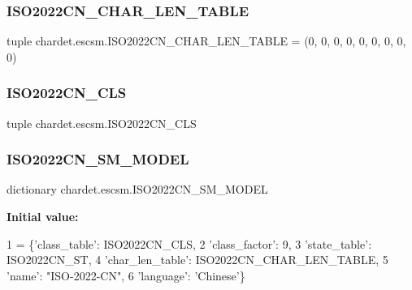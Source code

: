 \subsubsection{\texorpdfstring{I\+S\+O2022\+C\+N\+\_\+\+C\+H\+A\+R\+\_\+\+L\+E\+N\+\_\+\+T\+A\+B\+LE}{ISO2022CN\_CHAR\_LEN\_TABLE}}
{\footnotesize\ttfamily tuple chardet.\+escsm.\+I\+S\+O2022\+C\+N\+\_\+\+C\+H\+A\+R\+\_\+\+L\+E\+N\+\_\+\+T\+A\+B\+LE = (0, 0, 0, 0, 0, 0, 0, 0, 0)}

\mbox{\label{namespacechardet_1_1escsm_a5c5e3dadf36c1a89eb2a970acc25160c}} 
\subsubsection{\texorpdfstring{I\+S\+O2022\+C\+N\+\_\+\+C\+LS}{ISO2022CN\_CLS}}
{\footnotesize\ttfamily tuple chardet.\+escsm.\+I\+S\+O2022\+C\+N\+\_\+\+C\+LS}

\mbox{\label{namespacechardet_1_1escsm_a98919247b6ea84f408a1659b3e2fbdd3}} 
\subsubsection{\texorpdfstring{I\+S\+O2022\+C\+N\+\_\+\+S\+M\+\_\+\+M\+O\+D\+EL}{ISO2022CN\_SM\_MODEL}}
{\footnotesize\ttfamily dictionary chardet.\+escsm.\+I\+S\+O2022\+C\+N\+\_\+\+S\+M\+\_\+\+M\+O\+D\+EL}

{\bfseries Initial value\+:}
\begin{DoxyCode}
1 =  \{\textcolor{stringliteral}{'class\_table'}: ISO2022CN\_CLS,
2                       \textcolor{stringliteral}{'class\_factor'}: 9,
3                       \textcolor{stringliteral}{'state\_table'}: ISO2022CN\_ST,
4                       \textcolor{stringliteral}{'char\_len\_table'}: ISO2022CN\_CHAR\_LEN\_TABLE,
5                       \textcolor{stringliteral}{'name'}: \textcolor{stringliteral}{"ISO-2022-CN"},
6                       \textcolor{stringliteral}{'language'}: \textcolor{stringliteral}{'Chinese'}\}
\end{DoxyCode}
\mbox{\label{namespacechardet_1_1escsm_a328edfc3dc32929d2e9600255340b945}} 
